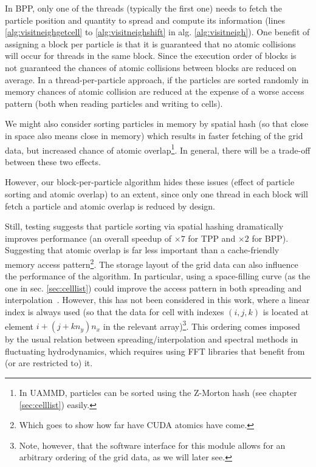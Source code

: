 \documentclass[twoside,openright,titlepage,numbers=noenddot,%
headinclude,footinclude,cleardoublepage=empty,abstract=on,
BCOR=5mm,fontsize=11pt, dvipsnames, paper=b5
]{scrreprt}
\newcommand{\uammd}{\gls{UAMMD}\xspace}
\begin{document}
In BPP, only one of the threads (typically the first one) needs to fetch the particle position and quantity to spread and compute its information (lines \ref{alg:visitneighgetcell} to \ref{alg:visitneighshift} in alg. \ref{alg:visitneigh}).
One benefit of assigning a block per particle is that it is guaranteed that no atomic collisions will occur for threads in the same block. Since the execution order of blocks is not guaranteed the chances of atomic collisions between blocks are reduced on average.
In a thread-per-particle approach, if the particles are sorted randomly in memory chances of atomic collision are reduced at the expense of a worse access pattern (both when reading particles and writing to cells).

We might also consider sorting particles in memory by spatial hash (so that close in space also means close in memory) which results in faster fetching of the grid data, but increased chance of atomic overlap\footnote{In \uammd, particles can be sorted using the Z-Morton hash (see chapter \ref{sec:celllist}) easily.}. In general, there will be a trade-off between these two effects.

However, our block-per-particle algorithm hides these issues (effect of particle sorting and atomic overlap) to an extent, since only one thread in each block will fetch a particle and atomic overlap is reduced by design.

Still, testing suggests that particle sorting via spatial hashing dramatically improves performance (an overall speedup of $\times 7$ for TPP and $\times 2$ for BPP). Suggesting that atomic overlap is far less important than a cache-friendly memory access pattern\footnote{Which goes to show how far have CUDA atomics have come.}.
The storage layout of the grid data can also influence the performance of the algorithm. In particular, using a space-filling curve (as the one in sec. \ref{sec:celllist}) could improve the access pattern in both spreading and interpolation~\cite{Shih2021}. However, this has not been considered in this work, where a linear index is always used (so that the data for cell with indexes $(i,j,k)$ is located at element $i+(j+kn_y)n_x$ in the relevant array)\footnote{Note, however, that the software interface for this module allows for an arbitrary ordering of the grid data, as we will later see.}. This ordering comes imposed by the usual relation between spreading/interpolation and spectral methods in fluctuating hydrodynamics, which requires using \gls{FFT} libraries that benefit from (or are restricted to) it.
\end{document}
